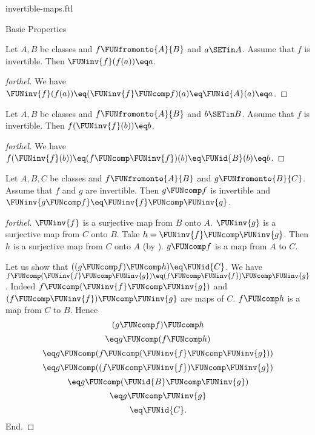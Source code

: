\documentclass{stex}
\begin{document}
\begin{smodule}{invertible-maps.ftl}
\begin{sfragment}{Basic Properties}
  \begin{proposition}[forthel,id=FOUNDATIONS_09_4606651604664320]
    Let $A, B$ be classes and $f \FUNfromonto{A}{B}$ and $a \SETin A$.
    Assume that $f$ is invertible.
    Then $\FUNinv{f}(f(a)) \eq a$.
  \end{proposition}
  \begin{proof}[forthel]
    We have $\FUNinv{f}(f(a)) \eq (\FUNinv{f} \FUNcomp f)(a) \eq \FUNid{A}(a) \eq a$.
  \end{proof}

  \begin{proposition}[forthel,id=FOUNDATIONS_09_6093864386712935]
    Let $A, B$ be classes and $f \FUNfromonto{A}{B}$ and $b \SETin B$.
    Assume that $f$ is invertible.
    Then $f(\FUNinv{f}(b)) \eq b$.
  \end{proposition}
  \begin{proof}[forthel]
    We have
    $f(\FUNinv{f}(b))
      \eq (f \FUNcomp \FUNinv{f})(b)
      \eq \FUNid{B}(b)
      \eq b$.
  \end{proof}

  \begin{proposition}[forthel,id=FOUNDATIONS_09_7619151963095040]
    Let $A, B, C$ be classes and $f \FUNfromonto{A}{B}$ and $g \FUNfromonto{B}{C}$.
    Assume that $f$ and $g$ are invertible.
    Then $g \FUNcomp f$ is invertible and $\FUNinv{g \FUNcomp f} \eq \FUNinv{f} \FUNcomp \FUNinv{g}$.
  \end{proposition}
  \begin{proof}[forthel]
    $\FUNinv{f}$ is a surjective map from $B$ onto $A$.
    $\FUNinv{g}$ is a surjective map from $C$ onto $B$.
    Take $h = \FUNinv{f} \FUNcomp \FUNinv{g}$.
    Then $h$ is a surjective map from $C$ onto $A$ (by ).
    $g \FUNcomp f$ is a map from $A$ to $C$.

    Let us show that $((g \FUNcomp f) \FUNcomp h) \eq \FUNid{C}$.
      We have $f \FUNcomp (\FUNinv{f} \FUNcomp \FUNinv{g}) \eq (f \FUNcomp \FUNinv{f}) \FUNcomp \FUNinv{g}$.
      Indeed $f \FUNcomp (\FUNinv{f} \FUNcomp \FUNinv{g})$ and $(f \FUNcomp \FUNinv{f}) \FUNcomp \FUNinv{g}$ are maps of $C$.
      $f \FUNcomp h$ is a map from $C$ to $B$.
      Hence
      \[  (g \FUNcomp f) \FUNcomp h                           \]
      \[    \eq g \FUNcomp (f \FUNcomp h)                       \]
      \[    \eq g \FUNcomp (f \FUNcomp (\FUNinv{f} \FUNcomp \FUNinv{g}))   \]
      \[    \eq g \FUNcomp ((f \FUNcomp \FUNinv{f}) \FUNcomp \FUNinv{g})   \]
      \[    \eq g \FUNcomp (\FUNid{B} \FUNcomp \FUNinv{g})            \]
      \[    \eq g \FUNcomp \FUNinv{g}                            \]
      \[    \eq \FUNid{C}.                                  \]
    End.


\end{proof}
\end{sfragment}
\end{smodule}
\end{document}
